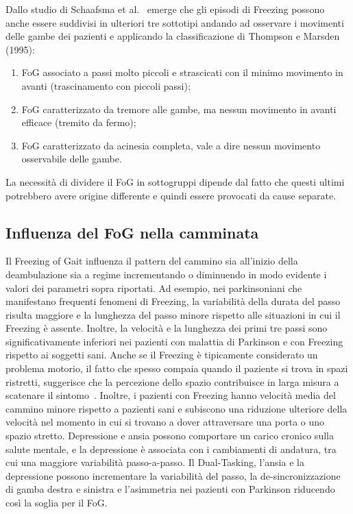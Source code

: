 Dallo studio di Schaafsma et al.~\cite{30} emerge che gli episodi di Freezing possono anche essere suddivisi in ulteriori tre sottotipi andando ad osservare i movimenti delle gambe dei pazienti e applicando la classificazione di Thompson e Marsden (1995):
\begin{enumerate}
	\item FoG associato a passi molto piccoli e strascicati con il minimo movimento in avanti (trascinamento con piccoli passi);
	\item FoG caratterizzato da tremore alle gambe, ma nessun movimento in avanti efficace (tremito da fermo);
	\item FoG caratterizzato da acinesia completa, vale a dire nessun movimento osservabile delle gambe.
\end{enumerate}
La necessità di dividere il FoG in sottogruppi dipende dal fatto che questi ultimi potrebbero avere origine differente e quindi essere provocati da cause separate.
\subsection{Influenza del FoG nella camminata}
Il Freezing of Gait influenza il pattern del cammino sia all’inizio della deambulazione sia a regime incrementando o diminuendo in modo evidente i valori dei parametri sopra riportati. Ad esempio, nei parkinsoniani che manifestano frequenti fenomeni di Freezing, la variabilità della durata del passo risulta maggiore e la lunghezza del passo minore rispetto alle situazioni in cui il Freezing è assente. Inoltre, la velocità e la lunghezza dei primi tre passi sono significativamente inferiori nei pazienti con malattia di Parkinson e con Freezing rispetto ai soggetti sani. Anche se il Freezing è tipicamente considerato un problema motorio, il fatto che spesso compaia quando il paziente si trova in spazi ristretti, suggerisce che la percezione dello spazio contribuisce in larga misura a scatenare il sintomo~\cite{37}. Inoltre, i pazienti con Freezing hanno velocità media del cammino minore rispetto a pazienti sani e subiscono una riduzione ulteriore della velocità nel momento in cui si trovano a dover attraversare una porta o uno spazio stretto. Depressione e ansia possono comportare un carico cronico sulla salute mentale, e la depressione è associata con i cambiamenti di andatura, tra cui una maggiore variabilità passo-a-passo. Il Dual-Tasking, l’ansia e la depressione possono incrementare la variabilità del passo, la de-sincronizzazione di gamba destra e sinistra e l'asimmetria nei pazienti con Parkinson riducendo così la soglia per il FoG. \\

